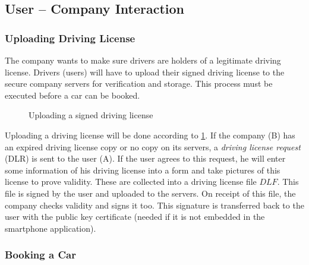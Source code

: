 \subsection{User -- Company Interaction}

\subsubsection{Uploading Driving License}

The company wants to make sure drivers are holders of a legitimate driving license. Drivers (users) will have to upload their signed driving license to the secure company servers for verification and storage. This process must be executed before a car can be booked.

\begin{figure}[!ht]
  \renewcommand{\Bx}{8}
  \setcounter{CC}{0}
  \centering
  \caption{Uploading a signed driving license}
  \label{DriversLicense}
\end{figure}

Uploading a driving license will be done according to \cref{DriversLicense}. If the company (B) has an expired driving license copy or no copy on its servers, a \emph{driving license request} (DLR) is sent to the user (A). If the user agrees to this request, he will enter some information of his driving license into a form and take pictures of this license to prove validity. These are collected into a driving license file $DLF$. This file is signed by the user and uploaded to the servers. On receipt of this file, the company checks validity and signs it too. This signature is transferred back to the user with the public key certificate (needed if it is not embedded in the smartphone application).

\subsubsection{Booking a Car\label{ObtaingCOC}}

